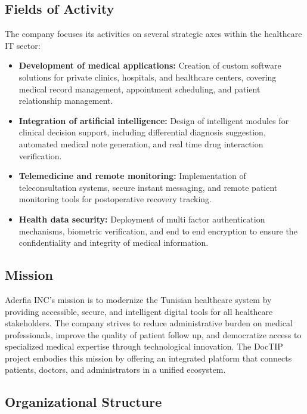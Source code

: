 \documentclass[12pt,a4paper,oneside]{report}
\begin{document}
\subsection{Fields of Activity}

The company focuses its activities on several strategic axes within the healthcare IT sector:

\begin{itemize}
    \item \textbf{Development of medical applications:} Creation of custom software solutions for private clinics, hospitals, and healthcare centers, covering medical record management, appointment scheduling, and patient relationship management.
    \item \textbf{Integration of artificial intelligence:} Design of intelligent modules for clinical decision support, including differential diagnosis suggestion, automated medical note generation, and real time drug interaction verification.
    \item \textbf{Telemedicine and remote monitoring:} Implementation of teleconsultation systems, secure instant messaging, and remote patient monitoring tools for postoperative recovery tracking.
    \item \textbf{Health data security:} Deployment of multi factor authentication mechanisms, biometric verification, and end to end encryption to ensure the confidentiality and integrity of medical information.
\end{itemize}

\subsection{Mission}

Aderfia INC's mission is to modernize the Tunisian healthcare system by providing accessible, secure, and intelligent digital tools for all healthcare stakeholders. The company strives to reduce administrative burden on medical professionals, improve the quality of patient follow up, and democratize access to specialized medical expertise through technological innovation. The DocTIP project embodies this mission by offering an integrated platform that connects patients, doctors, and administrators in a unified ecosystem.

\subsection{Organizational Structure}
\end{document}
